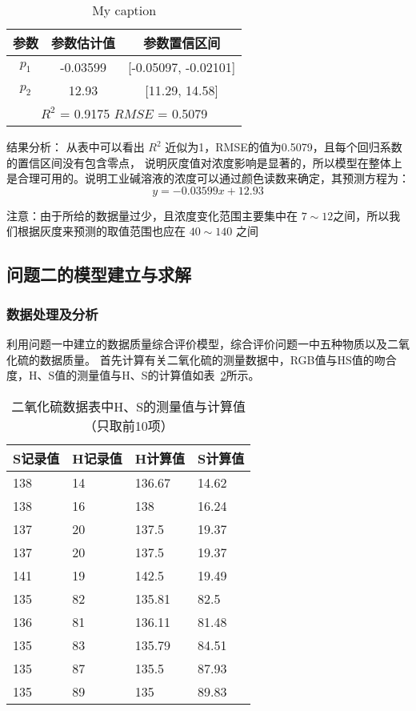     \begin{table}[H]
        \centering
        \caption{My caption}
        \label{my-label}
        \begin{tabular}{@{}ccc@{}}
        \toprule
        参数       & 参数估计值      & 参数置信区间                     \\ \midrule
        $p_1$    & -0.03599   & {[}-0.05097, -0.02101{]}   \\
        $p_2$    & 12.93      & {[}11.29, 14.58{]}         \\
        \hline
        \multicolumn{3}{c}{$R^2$ = 0.9175 $RMSE$ = 0.5079} \\ \bottomrule
        \end{tabular}
        \end{table}

    结果分析： 从表中可以看出 $R^2$ 近似为1，RMSE的值为0.5079，且每个回归系数的置信区间没有包含零点，
    说明灰度值对浓度影响是显著的，所以模型在整体上是合理可用的。说明工业碱溶液的浓度可以通过颜色读数来确定，其预测方程为：
        $$y = -0.03599 x + 12.93 $$

    注意：由于所给的数据量过少，且浓度变化范围主要集中在 $7 \sim 12$之间，所以我们根据灰度来预测的取值范围也应在 $40 \sim 140$
    之间



\subsection{问题二的模型建立与求解}

\subsubsection{数据处理及分析}

利用问题一中建立的数据质量综合评价模型，综合评价问题一中五种物质以及二氧化硫的数据质量。
首先计算有关二氧化硫的测量数据中，RGB值与HS值的吻合度，H、S值的测量值与H、S的计算值如表~\ref{SO2_HSCheck}所示。

\begin{table}[]
    \centering
    \caption{二氧化硫数据表中H、S的测量值与计算值（只取前10项）}
    \label{SO2_HSCheck}
    \begin{tabular}{@{}llll@{}}
    \toprule
    S记录值 & H记录值 & H计算值        & S计算值        \\ \midrule
    138  & 14   & 136.67 & 14.62 \\
    138  & 16   & 138         & 16.24 \\
    137  & 20   & 137.5       & 19.37 \\
    137  & 20   & 137.5       & 19.37 \\
    141  & 19   & 142.5       & 19.49 \\
    135  & 82   & 135.81 & 82.5        \\
    136  & 81   & 136.11 & 81.48 \\
    135  & 83   & 135.79 & 84.51 \\
    135  & 87   & 135.5       & 87.93 \\
    135  & 89   & 135         & 89.83 \\ \bottomrule
    \end{tabular}
    \end{table}

